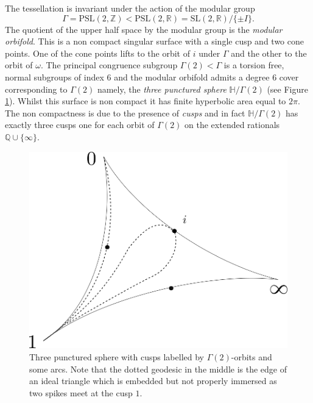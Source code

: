 \documentclass[12pt]{amsart}
\theoremstyle{plain}
\theoremstyle{definition}
\def\HH{\mathbb{H}}
\def\ZZ{\mathbb{Z}}
\def\RR{\mathbb{R}}
\def\QQ{\mathbb{Q}}
\def\sl2{\mathrm{PSL}(2, \ZZ)}
\def\slr{\mathrm{PSL}(2, \RR)}
\def\g2{\Gamma(2)}
\begin{document}
The tessellation is invariant under the action of the modular group
$$\Gamma = \sl2< \slr = \mathrm{SL}(2, \RR)/\{ \pm I\}.$$
The quotient  of the upper half space by the modular group 
is the \textit{modular orbifold}. This is a non compact singular
surface with a single cusp and two cone points. 
One of the cone points lifts to the orbit of $i$  under $\Gamma$ 
and the other to the orbit of $\omega$.
The principal congruence subgroup $\g2<\Gamma$
 is a torsion free, normal subgroups of index 6
and the modular orbifold admits a degree 6 cover
corresponding to $\g2$
namely, the \textit{three punctured sphere} $\HH/\g2$ (see Figure \ref{3punctured}).
Whilst this surface is non compact it has finite hyperbolic area
equal to $2\pi$. The non compactness is due to the presence of
\textit{cusps} and in fact  $\HH/\g2$ has exactly three cusps one for each orbit of $\g2$ on the extended rationals $\QQ \cup \{ \infty \}$.


\begin{figure}[ht]
\begin{center}
\includegraphics[scale=.4]{3sphere.png} 
% 
\end{center}
\caption{Three punctured sphere with cusps labelled by $\Gamma(2)$-orbits
and some arcs.
Note that the dotted geodesic in the middle is the edge 
of an ideal triangle which is embedded but not properly immersed
as two spikes meet at the cusp $1$.}
 \label{3punctured}
\end{figure}
\end{document}
